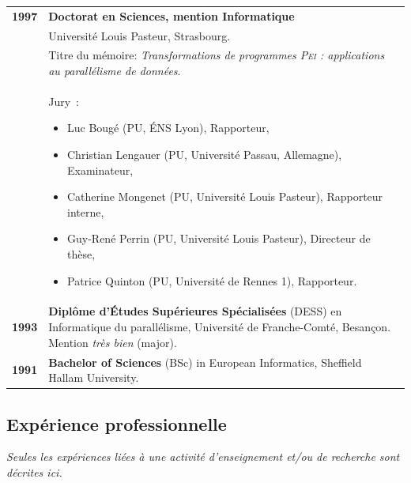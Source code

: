\documentclass[11pt]{article}
\begin{document}
\begin{tabular}{lp{14.8cm}}
	\textbf{1997} & \textbf{Doctorat en Sciences, mention Informatique}\\
			  & Université Louis Pasteur, Strasbourg.\\
      		  & Titre du mémoire: {\em Transformations de programmes \textsc{Pei} : applications au parallélisme de données}.\\
		        & Jury~:
				\begin{small}
				\begin{itemize}
					\item Luc Bougé (PU, \'{E}NS Lyon), Rapporteur,
			    		\item Christian Lengauer (PU, Université Passau, Allemagne), Examinateur,
					\item Catherine Mongenet (PU, Université Louis Pasteur), Rapporteur interne,
					\item Guy-René Perrin (PU, Université Louis Pasteur), Directeur de thèse,
					\item Patrice Quinton (PU, Université de Rennes 1), Rapporteur.
				\end{itemize}
				\end{small}\\[2mm]
	\textbf{1993} &  \textbf{Diplôme d'\'{E}tudes Supérieures Spécialisées} (DESS) en Informatique du parallélisme, 
				  Université de Franche-Comté, Besançon. Mention {\em très bien} (major).\\[2mm]
	\textbf{1991} &  \textbf{Bachelor of Sciences} (BSc) in European Informatics, Sheffield Hallam University.\\[2mm]

\end{tabular}
\newpage


\subsection{Expérience professionnelle}

\textit{Seules les expériences liées à une activité d'enseignement et/ou de recherche sont décrites ici.}\\[2mm]
\end{document}
